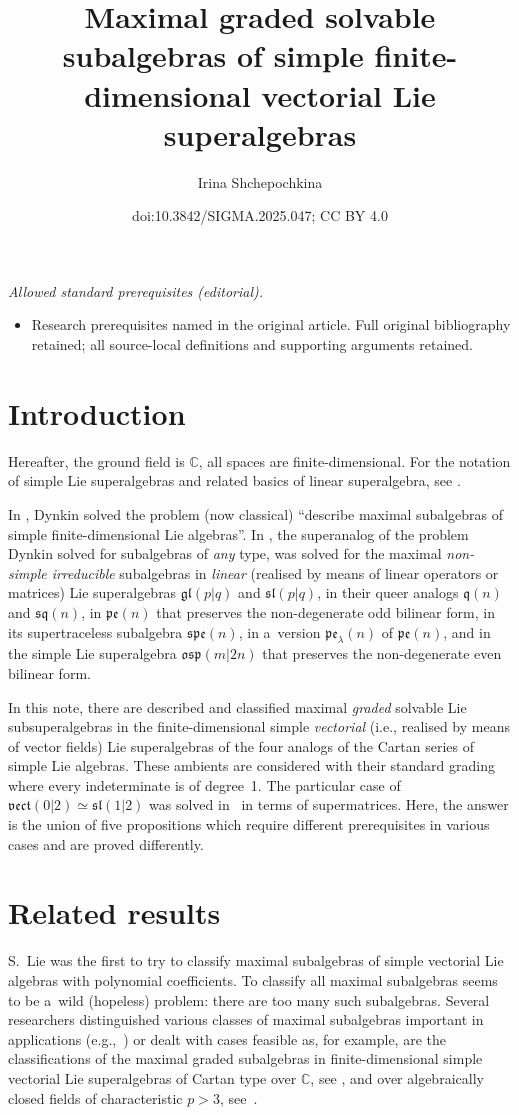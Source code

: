 \documentclass[10pt,a4paper]{amsart}
\title{Maximal graded solvable subalgebras of simple finite-dimensional vectorial Lie superalgebras}
\author{Irina Shchepochkina}
\date{doi:10.3842/SIGMA.2025.047; CC BY 4.0}
\newcommand {\Cee} {{\mathbb C}}
\newcommand {\fgl} {{\mathfrak{gl}}} %
\newcommand {\fosp} {{\mathfrak{osp}}}
\newcommand {\fpe} {{\mathfrak{pe}}} %
\newcommand {\fq} {{\mathfrak{q}}}
\newcommand {\fsl} {{\mathfrak{sl}}}
\newcommand {\fspe} {{\mathfrak{spe}}}
\newcommand {\fsq} {{\mathfrak{sq}}}
\newcommand {\fvect} {{\mathfrak{vect}}} %
\newcommand {\<} [2] {{\left.\vphantom{#2}\right.^{#1\!}\!{#2}}}
\numberwithin{equation}{section}
\begin{document}
\maketitle
\noindent\textit{Allowed standard prerequisites (editorial).}\begin{itemize}
\item Research prerequisites named in the original article. Full original bibliography retained; all source-local definitions and supporting arguments retained.
\end{itemize}\medskip
\section{Introduction}
Hereafter, the ground field is $\Cee$, all spaces are finite-dimensional. For the notation of simple Lie superalgebras and related basics of linear superalgebra, see \cite{Lo}.

In \cite{Dy}, Dynkin solved the problem (now classical) ``describe maximal subalgebras of simple finite-dimensional Lie algebras''.
In \cite{ShM}, the superanalog of the problem Dynkin solved for subalgebras of \textit{any} type, was solved for the maximal \textit{non-simple irreducible}  subalgebras in \textit{linear} (realised by means of linear operators or matrices) Lie superalgebras $\fgl(p|q)$ and $\fsl(p|q)$, in their queer analogs $\fq(n)$ and $\fsq(n)$, in $\fpe(n)$ that preserves the non-degenerate odd bilinear form, in its supertraceless subalgebra $\fspe(n)$, in a~version $\fpe_\lambda(n)$ of $\fpe(n)$, and in the simple Lie superalgebra $\fosp(m|2n)$ that preserves the non-degenerate even bilinear form.


In this note, there are described and classified maximal \textit{graded} solvable Lie subsuperalgebras in the finite-dimensional simple \textit{vectorial} (i.e., realised by means of vector fields) Lie superalgebras of the four analogs of the Cartan series of simple Lie algebras. These ambients are considered with their standard grading where every indeterminate is of degree~1. The particular case of $\fvect(0|2)\simeq \fsl(1|2)$ was solved in~\cite{S2} in terms of supermatrices. Here, the answer is the union of five propositions which require different prerequisites in various cases and are proved differently.

\section{Related results}
S.~Lie was the first to try to classify maximal subalgebras of simple vectorial Lie algebras
with polynomial coefficients. To classify all maximal subalgebras seems
to be a~wild (hopeless) problem: there are too many such subalgebras. Several researchers distinguished various classes of maximal subalgebras important in applications (e.g.,~\cite{Og,So}) or dealt with cases feasible as, for example, are the classifications of the maximal graded subalgebras in finite-dimensional simple vectorial Lie superalgebras of Cartan type over $\Cee$, see \cite{BLM}, and over algebraically closed fields of characteristic $p>3$, see~\cite{BLLM}.
\end{document}
